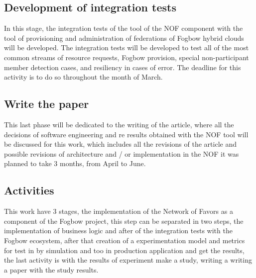 \documentclass{article}
\begin{document}
\subsection{Development of integration tests}
    In this stage, the integration tests of the tool of the NOF component with the tool of provisioning and administration of federations of Fogbow hybrid clouds will be developed. The integration tests will be developed to test all of the most common streams of resource requests, Fogbow provision, special non-participant member detection cases, and resiliency in cases of error. The deadline for this activity is to do so throughout the month of March.
\subsection{Write the paper}
    This last phase will be dedicated to the writing of the article, where all the decisions of software engineering and re results obtained with the NOF tool will be discussed for this work, which includes all the revisions of the article and possible revisions of architecture and / or implementation in the NOF it was planned to take 3 months, from April to June.

\subsection{Activities}
This work have 3 stages, the implementation of the Network of Favors as a component of the Fogbow project, this step can be separated in two steps, the implementation of business logic and after of the integration tests with the Fogbow ecosystem, after that creation of a experimentation model and metrics for test in by simulation and too in production application and get the results, the last activity is with the results of experiment make a study, writing a writing a paper with the study results.
\end{document}
